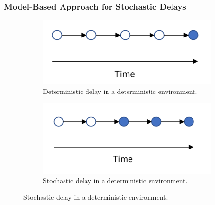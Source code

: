             \subsubsection{Model-Based Approach for Stochastic Delays} 
                \begin{figure}[t]
                    \centering
                    
                    \begin{subfigure}[b]{.45\textwidth}
                        \centering
                        \includegraphics[width=\textwidth]{images/dmdp/modelbased_stochastic_1.png}
                        \caption{Deterministic delay in a deterministic environment.}
                        \label{fig:modelbased_stochastic_1}
                    \end{subfigure}
                    \hfill
                    \begin{subfigure}[b]{.45\textwidth}
                        \centering
                        \includegraphics[width=\textwidth]{images/dmdp/modelbased_stochastic_2.png}
                        \caption{Stochastic delay in a deterministic environment.}
                        \label{fig:modelbased_stochastic_2}
                    \end{subfigure}
                    

\end{figure}
